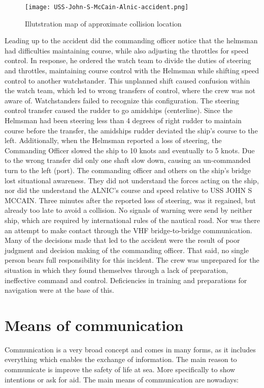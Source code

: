 \begin{wrapfigure}{L}{0.6\textwidth}
	\centering
	\texttt{[image: USS-John-S-McCain-Alnic-accident.png]}
	\caption{Illutstration map of approximate collision location}
	\label{fig:Accident-USS-John-S-McCain-Alnic}
\end{wrapfigure}

Leading up to the accident did the commanding officer notice that the helmsman had difficulties maintaining course, while also adjusting the throttles for speed control. In response, he ordered the watch team to divide the duties of steering and throttles, maintaining course control with the Helmsman while shifting speed control to another watchstander. This unplanned shift caused confusion within the watch team, which led to wrong transfers of control, where the crew was not aware of. 
Watchstanders failed to recognize this configuration. The steering control transfer caused the rudder to go amidships (centerline). Since the Helmsman had been steering less than 4 degrees of right rudder to maintain course before the transfer, the amidships rudder deviated the ship’s course to the left. Additionally, when the Helmsman reported a loss of steering, the Commanding Officer slowed the ship to 10 knots and eventually to 5 knots. Due to the wrong transfer did only one shaft slow down, causing an un-commanded turn to the left (port). The commanding officer and others on the ship's bridge lost situational awareness. They did not understand the forces acting on the ship, nor did the understand the ALNIC's course and speed relative to USS JOHN S MCCAIN. Three minutes after the reported loss of steering, was it regained, but already too late to avoid a collision. No signals of warning were send by neither ship, which are required by international rules of the nautical road. Nor was there an attempt to make contact through the \ac{VHF} bridge-to-bridge communication.
Many of the decisions made that led to the accident were the result of poor judgment and decision making of the commanding officer. That said, no single person bears full responsibility for this incident. The crew was unprepared for the situation in which they found themselves through a lack of preparation, ineffective command and control. Deficiencies in training and preparations for navigation were at the base of this. \cite{USNavy2017}

\section{Means of communication}
Communication is a very broad concept and comes in many forms, as it includes everything which enables the exchange of information. The main reason to communicate is improve the safety of life at sea. More specifically to show intentions or ask for aid. The main means of communication are nowadays:

